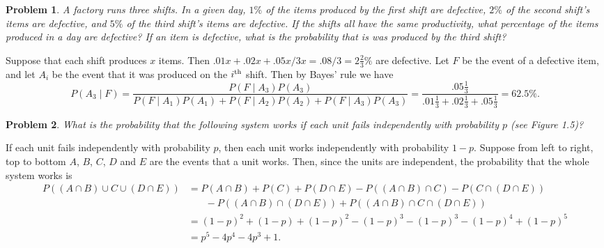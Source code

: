 \documentclass{article}
\newtheorem{problem}{Problem}
\renewcommand{\th}{^{\textup{th}}}
\begin{document}
\begin{problem}
A factory runs three shifts. In a given day, $1\%$ of the items produced by the first shift are defective, $2\%$ of the second shift's items are defective, and $5\%$ of the third shift's items are defective. If the shifts all have the same productivity, what percentage of the items produced in a day are defective? If an item is defective, what is the probability that is was produced by the third shift?
\end{problem}

Suppose that each shift produces $x$ items. Then $.01x + .02x + .05x/3x = .08/3 = 2 \frac{2}{3}\%$ are defective. Let $F$ be the event of a defective item, and let $A_i$ be the event that it was produced on the $i\th$ shift. Then by Bayes' rule we have
\[
P(A_3 \mid F) = \frac{P(F \mid A_3) P(A_3)}{P(F \mid A_1)P(A_1) + P(F \mid A_2)P(A_2) + P(F \mid A_3)P(A_3)} = \frac{.05 \frac{1}{3}}{.01 \frac{1}{3} + .02 \frac{1}{3} + .05 \frac{1}{3}} = 62.5\%.
\]

\begin{problem}
What is the probability that the following system works if each unit fails independently with probability $p$ (see Figure 1.5)?
\end{problem}

If each unit fails independently with probability $p$, then each unit works independently with probability $1-p$. Suppose from left to right, top to bottom $A$, $B$, $C$, $D$ and $E$ are the events that a unit works. Then, since the units are independent, the probability that the whole system works is
\begin{align*}
P((A \cap B) \cup C \cup (D \cap E))
&= P(A \cap B) + P(C) + P(D \cap E) - P((A \cap B) \cap C) - P(C \cap (D \cap E))\\
&~~~~~~~~- P((A \cap B) \cap (D \cap E)) + P((A \cap B) \cap C \cap (D \cap E))\\
&= (1-p)^2 + (1-p) + (1-p)^2 - (1-p)^3 - (1-p)^3 - (1-p)^4 + (1-p)^5\\
&= p^5 - 4p^4 -4p^3 + 1.
\end{align*}
\end{document}

